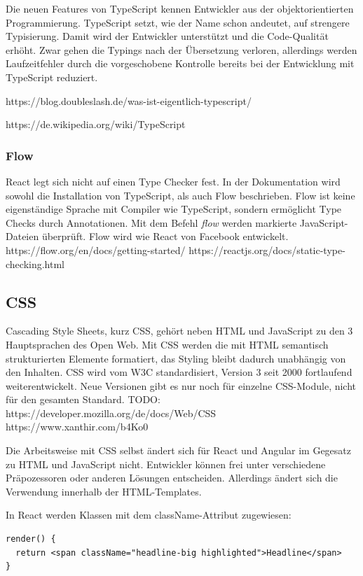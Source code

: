 Die neuen Features von TypeScript kennen Entwickler aus der objektorientierten Programmierung. TypeScript setzt, wie der Name schon andeutet, auf strengere Typisierung.
Damit wird der Entwickler unterstützt und die Code-Qualität erhöht. Zwar gehen die Typings nach der Übersetzung verloren, allerdings werden Laufzeitfehler durch die vorgeschobene Kontrolle bereits bei der Entwicklung mit TypeScript reduziert.

https://blog.doubleslash.de/was-ist-eigentlich-typescript/

https://de.wikipedia.org/wiki/TypeScript

\subsubsection{Flow}

React legt sich nicht auf einen Type Checker fest. In der Dokumentation wird sowohl die Installation von TypeScript, als auch Flow beschrieben. Flow ist keine eigenständige Sprache mit Compiler wie TypeScript, sondern ermöglicht Type Checks durch Annotationen. Mit dem Befehl \textit{flow} werden markierte JavaScript-Dateien überprüft. Flow wird wie React von Facebook entwickelt.
https://flow.org/en/docs/getting-started/
https://reactjs.org/docs/static-type-checking.html

\subsection{CSS}

Cascading Style Sheets, kurz CSS, gehört neben HTML und JavaScript zu den 3 Hauptsprachen des Open Web. Mit CSS werden die mit HTML semantisch strukturierten Elemente formatiert, das Styling bleibt dadurch unabhängig von den Inhalten. CSS wird vom W3C standardisiert, Version 3 seit 2000 fortlaufend weiterentwickelt. Neue Versionen gibt es nur noch für einzelne CSS-Module, nicht für den gesamten Standard.
TODO: https://developer.mozilla.org/de/docs/Web/CSS
https://www.xanthir.com/b4Ko0

Die Arbeitsweise mit CSS selbst ändert sich für React und Angular im Gegesatz zu HTML und JavaScript nicht. Entwickler können frei unter verschiedene Präpozessoren oder anderen Lösungen entscheiden. Allerdings ändert sich die Verwendung innerhalb der HTML-Templates.

In React werden Klassen mit dem className-Attribut zugewiesen: 
\begin{verbatim}
render() {
  return <span className="headline-big highlighted">Headline</span>
}
\end{verbatim}

